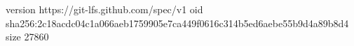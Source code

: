 version https://git-lfs.github.com/spec/v1
oid sha256:2c18acdc04c1a066aeb1759905e7ca449f0616c314b5ed6aebe55b9d4a89b8d4
size 27860
